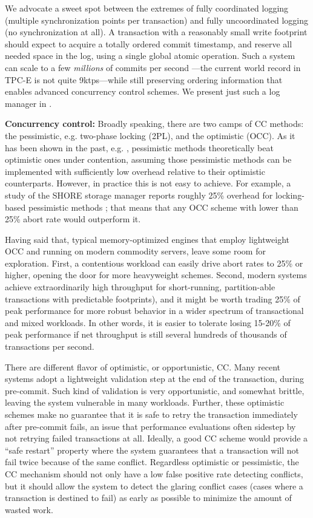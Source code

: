 We advocate a sweet spot between the extremes of fully coordinated logging (multiple synchronization points per transaction) and fully uncoordinated logging (no synchronization at all). A transaction with a reasonably small write footprint should expect to acquire a totally ordered commit timestamp, and reserve all needed space in the log, using a single global atomic operation. Such a system can scale to a few {\em millions} of commits per second \cite{TuZKLM13}---the current world record in TPC-E is not quite 9ktps---while still preserving ordering information that enables advanced concurrency control schemes. We present just such a log manager in .

\vspace{2mm} 
{\bf Concurrency control:} 
Broadly speaking, there are two camps of CC methods: the pessimistic, e.g. two-phase locking (2PL), and the optimistic (OCC). As it has been shown in the past, e.g. \cite{AgrawalCL87}, pessimistic methods theoretically beat optimistic ones under contention, assuming those pessimistic methods can be implemented with sufficiently low overhead relative to their optimistic counterparts. However, in practice this is not easy to achieve. For example, a study of the SHORE storage manager reports roughly 25\% overhead for locking-based pessimistic methods \cite{HarizopoulosAMS08}; that means that any OCC scheme with lower than 25\% abort rate would outperform it.

Having said that, typical memory-optimized engines that employ lightweight OCC and running on modern commodity servers, leave some room for exploration. First, a contentious workload can easily drive abort rates to 25\% or higher, opening the door for more heavyweight schemes. Second, modern systems achieve extraordinarily high throughput for short-running, partition-able transactions with predictable footprints), and it might be worth trading 25\% of peak performance for more robust behavior in a wider spectrum of transactional and mixed workloads. In other words, it is easier to tolerate losing 15-20\% of peak performance if net throughput is still several hundreds of thousands of transactions per second.


There are different flavor of optimistic, or opportunistic, CC. Many recent systems adopt a lightweight validation step at the end of the transaction, during pre-commit. Such kind of validation is very opportunistic, and somewhat brittle, leaving the system vulnerable in many workloads.
Further, these optimistic schemes make no guarantee that it is safe to retry the transaction immediately after pre-commit fails, an issue that performance evaluations often sidestep by not retrying failed transactions at all. Ideally, a good CC scheme would provide a ``safe restart'' property \cite{PortsG12} where the system guarantees that a transaction will not fail twice because of the same conflict.
Regardless optimistic or pessimistic, the CC mechanism should not only have a low false positive rate detecting conflicts, but it should allow the system to detect the glaring conflict cases (cases where a transaction is destined to fail) as early as possible to minimize the amount of wasted work.

